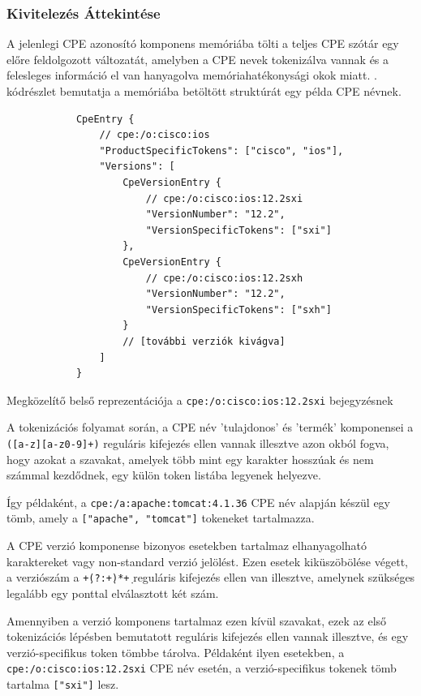 \subsubsection*{Kivitelezés Áttekintése}
	
	A jelenlegi CPE azonosító komponens memóriába tölti a teljes CPE szótár egy előre feldolgozott változatát, amelyben a CPE nevek tokenizálva vannak és a felesleges információ el van hanyagolva memóriahatékonysági okok miatt. \Az{\ref{ciscotokens}}. kódrészlet bemutatja a memóriába betöltött struktúrát egy példa CPE névnek.
	
	\begin{listing}[H]
		\begin{verbatim}
			CpeEntry {
				// cpe:/o:cisco:ios
				"ProductSpecificTokens": ["cisco", "ios"],
				"Versions": [
					CpeVersionEntry {
						// cpe:/o:cisco:ios:12.2sxi
						"VersionNumber": "12.2",
						"VersionSpecificTokens": ["sxi"]
					},
					CpeVersionEntry {
						// cpe:/o:cisco:ios:12.2sxh
						"VersionNumber": "12.2",
						"VersionSpecificTokens": ["sxh"]
					}
					// [további verziók kivágva]
				]
			}
		\end{verbatim}
		\caption{Megközelítő belső reprezentációja a \texttt{cpe:/o:cisco:ios:12.2sxi} bejegyzésnek}
		\label{ciscotokens}
	\end{listing}
	
	A tokenizációs folyamat során, a CPE név 'tulajdonos' és 'termék' komponensei a \texttt{([a-z][a-z0-9]+)} reguláris kifejezés ellen vannak illesztve azon okból fogva, hogy azokat a szavakat, amelyek több mint egy karakter hosszúak és nem számmal kezdődnek, egy külön token listába legyenek helyezve.
	
	Így példaként, a \texttt{cpe:/a:apache:tomcat:4.1.36} CPE név alapján készül egy tömb, amely a \texttt{["apache", "tomcat"]} tokeneket tartalmazza.
	
	A CPE verzió komponense bizonyos esetekben tartalmaz elhanyagolható karaktereket vagy non-standard verzió jelölést. Ezen esetek kiküszöbölése végett, a verziószám a \texttt{\d+\.(?:\d+\.)*\d+} reguláris kifejezés ellen van illesztve, amelynek szükséges legalább egy ponttal elválasztott két szám.
	
	Amennyiben a verzió komponens tartalmaz ezen kívül szavakat, ezek az első tokenizációs lépésben bemutatott reguláris kifejezés ellen vannak illesztve, és egy verzió-specifikus token tömbbe tárolva. Példaként ilyen esetekben, a \texttt{cpe:/o:cisco:ios:12.2sxi} CPE név esetén, a verzió-specifikus tokenek tömb tartalma \texttt{["sxi"]} lesz.
	
